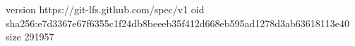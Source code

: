 version https://git-lfs.github.com/spec/v1
oid sha256:e7d3367e67f6355c1f24db8beeeb35f412d668eb595ad1278d3ab63618113e40
size 291957

